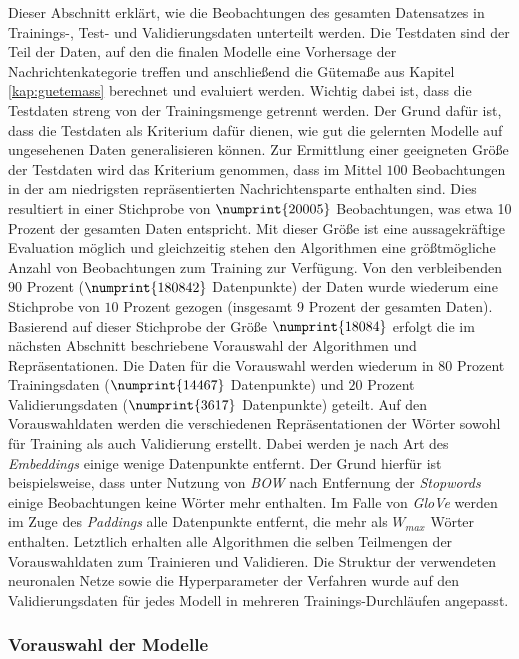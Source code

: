 \documentclass[a4paper,11pt]{article}
\begin{document}
Dieser Abschnitt erklärt, wie die  Beobachtungen des gesamten Datensatzes in \\
Trainings-, Test- und Validierungsdaten unterteilt werden.
Die Testdaten sind der Teil der Daten, auf den die finalen Modelle eine Vorhersage der Nachrichtenkategorie treffen und anschließend die Gütemaße aus Kapitel \ref{kap:guetemass} berechnet und evaluiert werden. Wichtig dabei ist, dass die Testdaten streng von der Trainingsmenge getrennt werden. Der Grund dafür ist, dass die Testdaten als Kriterium dafür dienen, wie gut die gelernten Modelle auf ungesehenen Daten generalisieren können. Zur Ermittlung einer geeigneten Größe der Testdaten wird das Kriterium genommen, dass im Mittel $100$ Beobachtungen in der am niedrigsten repräsentierten Nachrichtensparte enthalten sind. Dies resultiert in einer Stichprobe von $\numprint{20005}$ Beobachtungen, was etwa 10 Prozent der gesamten Daten entspricht. 
Mit dieser Größe ist eine aussagekräftige Evaluation möglich und gleichzeitig stehen den Algorithmen eine größtmögliche Anzahl von Beobachtungen zum Training zur Verfügung. Von den verbleibenden $90$ Prozent ($\numprint{180842}$ Datenpunkte) der Daten wurde wiederum eine Stichprobe von $10$ Prozent gezogen (insgesamt $9$ Prozent der gesamten Daten). Basierend auf dieser Stichprobe der Größe $\numprint{18084}$ erfolgt die im nächsten Abschnitt beschriebene Vorauswahl der Algorithmen und Repräsentationen. Die Daten für die Vorauswahl werden wiederum in $80$ Prozent Trainingsdaten ($\numprint{14467}$ Datenpunkte) und $20$ Prozent  Validierungsdaten ($\numprint{3617}$ Datenpunkte) geteilt. Auf den Vorauswahldaten werden die verschiedenen Repräsentationen der Wörter sowohl für Training als auch Validierung erstellt. Dabei werden je nach Art des \textit{Embeddings} einige wenige Datenpunkte entfernt. Der Grund hierfür ist beispielsweise, dass  unter Nutzung von \textit{BOW} nach Entfernung der \textit{Stopwords} einige Beobachtungen keine Wörter mehr enthalten. Im Falle von \textit{GloVe} werden im Zuge des \textit{Paddings} alle Datenpunkte entfernt, die mehr als $W_{max}$ Wörter enthalten.
Letztlich erhalten alle Algorithmen die selben Teilmengen der Vorauswahldaten zum Trainieren und Validieren. Die Struktur der verwendeten neuronalen Netze sowie die Hyperparameter der Verfahren wurde auf den Validierungsdaten für jedes Modell in mehreren Trainings-Durchläufen angepasst.

\subsubsection{Vorauswahl der Modelle}\label{kap:preselection}
\end{document}
